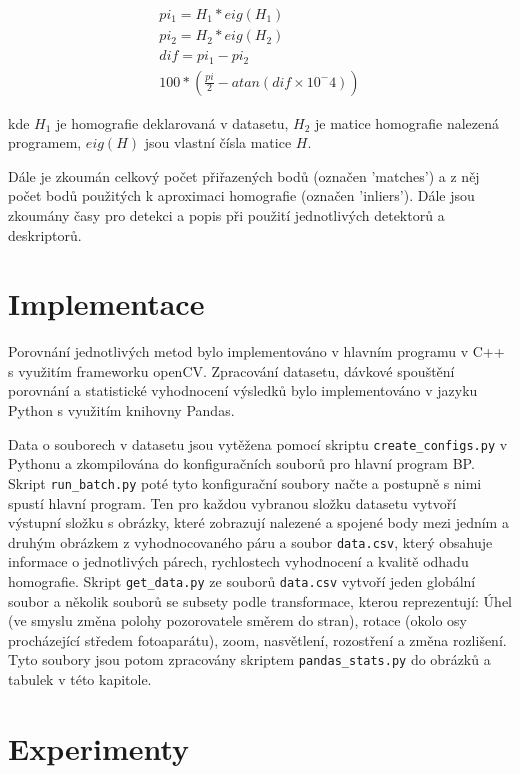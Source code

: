 \begin{align}
	pi_1 = H_1 * eig(H_1) \\
	pi_2 = H_2 * eig(H_2) \\
	dif = pi_1 - pi_2 \\
	100*(\frac{pi}{2} - atan(dif \times{} 10^-4))
\end{align}

kde $H_1$ je homografie deklarovaná v datasetu, $H_2$ je matice homografie nalezená
programem, $eig(H)$ jsou vlastní čísla matice $H$. 

Dále je zkoumán celkový počet přiřazených bodů (označen 'matches') a z něj počet bodů použitých k aproximaci homografie (označen 'inliers'). Dále jsou zkoumány časy pro detekci a popis při použití jednotlivých detektorů a deskriptorů. 


\section{Implementace}

Porovnání jednotlivých metod bylo implementováno v hlavním programu v C++ s využitím frameworku
openCV. Zpracování datasetu, dávkové spouštění porovnání a statistické vyhodnocení výsledků bylo
implementováno v jazyku Python s využitím knihovny Pandas.


Data o souborech v datasetu jsou vytěžena pomocí skriptu \verb|create_configs.py| v Pythonu a zkompilována do konfiguračních souborů pro hlavní program BP. Skript \verb|run_batch.py| poté tyto konfigurační soubory načte a postupně s nimi spustí hlavní program. Ten pro každou vybranou složku datasetu vytvoří výstupní složku s obrázky, které zobrazují nalezené a spojené body mezi jedním a druhým obrázkem z vyhodnocovaného páru a soubor \verb|data.csv|, který obsahuje informace o jednotlivých párech, rychlostech vyhodnocení a kvalitě odhadu homografie. Skript \verb|get_data.py| ze souborů \verb|data.csv| vytvoří jeden globální soubor a několik souborů se subsety podle transformace, kterou reprezentují: Úhel (ve smyslu změna polohy pozorovatele směrem do stran), rotace (okolo osy procházející středem fotoaparátu), zoom, nasvětlení, rozostření a změna rozlišení. Tyto soubory jsou potom zpracovány skriptem \verb|pandas_stats.py| do obrázků a tabulek v této kapitole.

\section{Experimenty}

